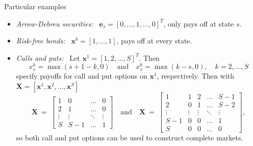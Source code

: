\documentclass[aspectratio=1610]{beamer}
\newcommand{\eq}{\ =\ }
\begin{document}
\begin{frame}{Particular examples}
\begin{itemize}
  \item {\em Arrow-Debreu securities:\ } $\bm e_s = [0,\dots,1,\dots, 0]^T$, only pays off at state $s$.
  \item {\em Risk-free bonds:\ } $\bm x^b = [1, \dots, 1]$, pays off at every state.
  \item {\em Calls and puts:\ } Let $\bm x^1 = [1, 2, \dots, S]^T$. Then
  \begin{equation}
    x^k_s=\max(s+1-k,0) \quad\text{and}\quad x^k_s=\max(k-s,0), \quad k=2,\dots,S
  \end{equation}
  specify payoffs for call and put options on $\bm x^1$, respectively. Then with $\bm X = [\bm x^1, \bm x^2, \dots, \bm x^S]$
  \begin{equation}
    \bm X \eq
    \begin{bmatrix}
      1 & 0 & \dots & 0 \\
      2 & 1 & \dots & 0 \\
      \vdots & \vdots & \ddots & \vdots \\
      S & S-1 & \dots & 1
    \end{bmatrix}
    \quad \text{and} \quad
    \bm X \eq
    \begin{bmatrix}
      1 & 1 & 2 & \dots & S-1 \\
      2 & 0 & 1 & \dots & S-2 \\
      \vdots & \vdots & \vdots & \ddots & \vdots \\
      S-1 & 0 & 0 & \dots & 1 \\
      S & 0 & 0 & \dots & 0
    \end{bmatrix},
  \end{equation}
  so both call and put options can be used to construct complete markets.
\end{itemize}
\end{frame}
\end{document}

